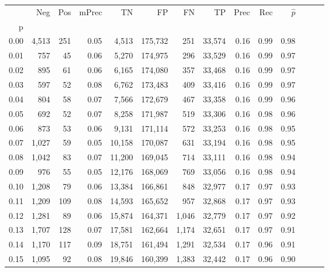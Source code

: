 \begin{tabular}{rrrrrrrrrrrrrr}
\toprule
{} &    Neg &  Pos & mPrec &       TN &       FP &      FN &      TP &  Prec &   Rec & $\hat{p}$ \\
p    &        &      &       &          &          &         &         &       &       &           \\
\midrule
0.00 &  4,513 &  251 &  0.05 &    4,513 &  175,732 &     251 &  33,574 &  0.16 &  0.99 &      0.98 \\
0.01 &    757 &   45 &  0.06 &    5,270 &  174,975 &     296 &  33,529 &  0.16 &  0.99 &      0.97 \\
0.02 &    895 &   61 &  0.06 &    6,165 &  174,080 &     357 &  33,468 &  0.16 &  0.99 &      0.97 \\
0.03 &    597 &   52 &  0.08 &    6,762 &  173,483 &     409 &  33,416 &  0.16 &  0.99 &      0.97 \\
0.04 &    804 &   58 &  0.07 &    7,566 &  172,679 &     467 &  33,358 &  0.16 &  0.99 &      0.96 \\
0.05 &    692 &   52 &  0.07 &    8,258 &  171,987 &     519 &  33,306 &  0.16 &  0.98 &      0.96 \\
0.06 &    873 &   53 &  0.06 &    9,131 &  171,114 &     572 &  33,253 &  0.16 &  0.98 &      0.95 \\
0.07 &  1,027 &   59 &  0.05 &   10,158 &  170,087 &     631 &  33,194 &  0.16 &  0.98 &      0.95 \\
0.08 &  1,042 &   83 &  0.07 &   11,200 &  169,045 &     714 &  33,111 &  0.16 &  0.98 &      0.94 \\
0.09 &    976 &   55 &  0.05 &   12,176 &  168,069 &     769 &  33,056 &  0.16 &  0.98 &      0.94 \\
0.10 &  1,208 &   79 &  0.06 &   13,384 &  166,861 &     848 &  32,977 &  0.17 &  0.97 &      0.93 \\
0.11 &  1,209 &  109 &  0.08 &   14,593 &  165,652 &     957 &  32,868 &  0.17 &  0.97 &      0.93 \\
0.12 &  1,281 &   89 &  0.06 &   15,874 &  164,371 &   1,046 &  32,779 &  0.17 &  0.97 &      0.92 \\
0.13 &  1,707 &  128 &  0.07 &   17,581 &  162,664 &   1,174 &  32,651 &  0.17 &  0.97 &      0.91 \\
0.14 &  1,170 &  117 &  0.09 &   18,751 &  161,494 &   1,291 &  32,534 &  0.17 &  0.96 &      0.91 \\
0.15 &  1,095 &   92 &  0.08 &   19,846 &  160,399 &   1,383 &  32,442 &  0.17 &  0.96 &      0.90 \\

\end{tabular}
